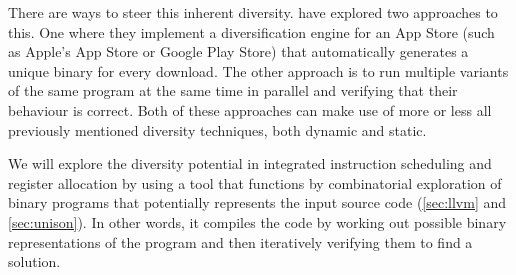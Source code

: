 There are ways to steer this inherent diversity. \textcite{compiler-generated-sw-div} have
explored two approaches to this. One where they implement a diversification engine for an
App Store (such as Apple's App Store or Google Play Store) that automatically generates a
unique binary for every download. The other approach is to run multiple variants of the same
program at the same time in parallel and verifying that their behaviour is correct. Both
of these approaches can make use of more or less all previously mentioned diversity techniques,
both dynamic and static.

We will explore the diversity potential in integrated instruction scheduling and register
allocation by using a tool that functions by combinatorial exploration of binary programs
that potentially represents the input source code (\ref{sec:llvm} and \ref{sec:unison}).
In other words, it compiles the code by working out possible binary representations of the
program and then iteratively verifying them to find a solution.

